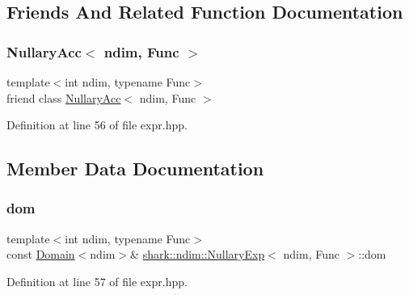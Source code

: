 \subsection{Friends And Related Function Documentation}
\hypertarget{classshark_1_1ndim_1_1_nullary_exp_aae3b9819be1b386ed4bb69e9a1e44726}{}\label{classshark_1_1ndim_1_1_nullary_exp_aae3b9819be1b386ed4bb69e9a1e44726} 
\subsubsection{\texorpdfstring{Nullary\+Acc$<$ ndim, Func $>$}{NullaryAcc< ndim, Func >}}
{\footnotesize\ttfamily template$<$int ndim, typename Func$>$ \\
friend class \hyperlink{classshark_1_1ndim_1_1_nullary_acc}{Nullary\+Acc}$<$ ndim, Func $>$\hspace{0.3cm}{\ttfamily [friend]}}



Definition at line 56 of file expr.\+hpp.



\subsection{Member Data Documentation}
\hypertarget{classshark_1_1ndim_1_1_nullary_exp_a4af666c034e0035ca4a9c4f8cf2f2ea2}{}\label{classshark_1_1ndim_1_1_nullary_exp_a4af666c034e0035ca4a9c4f8cf2f2ea2} 
\subsubsection{\texorpdfstring{dom}{dom}}
{\footnotesize\ttfamily template$<$int ndim, typename Func$>$ \\
const \hyperlink{classshark_1_1ndim_1_1_domain}{Domain}$<$ndim$>$\& \hyperlink{classshark_1_1ndim_1_1_nullary_exp}{shark\+::ndim\+::\+Nullary\+Exp}$<$ ndim, Func $>$\+::dom\hspace{0.3cm}{\ttfamily [private]}}



Definition at line 57 of file expr.\+hpp.

